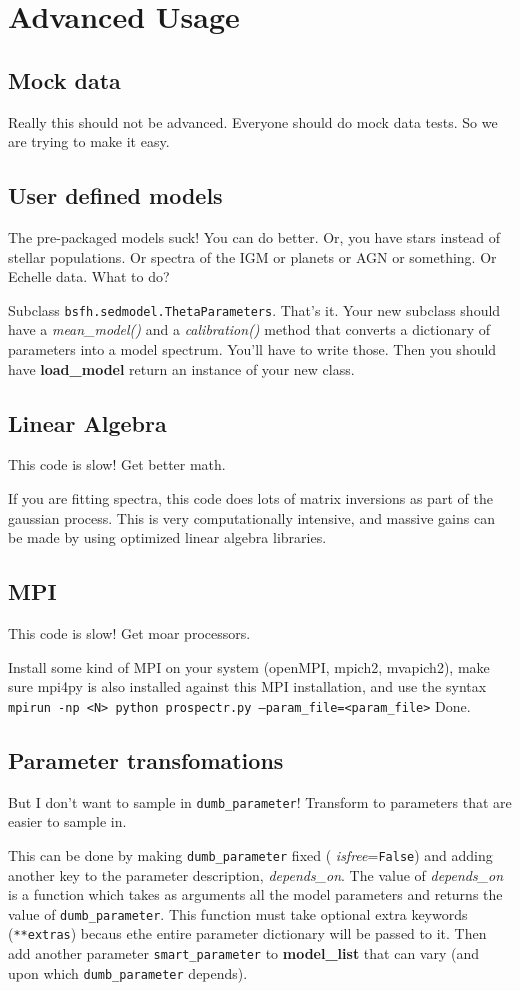 \documentclass[12pt, letterpaper, preprint]{aastex}
\begin{document}
\section{Advanced Usage}

\subsection{Mock data}
Really this should not be advanced.  Everyone should do mock data
tests.  So we are trying to make it easy.

\subsection{User defined models}
The pre-packaged models suck!  You can do better.  Or, you have stars
instead of stellar populations.  Or spectra of the IGM or planets or
AGN or something. Or Echelle data. What to do?

Subclass \texttt{bsfh.sedmodel.ThetaParameters}.  That's it.  Your new
subclass should have a {\it mean\_model()} and a {\it calibration()}
method that converts a dictionary of parameters into a model spectrum.
You'll have to write those.  Then you should have {\bf load\_model}
return an instance of your new class.

\subsection{Linear Algebra}
This code is slow!  Get better math.

If you are fitting spectra, this code does lots of matrix inversions
as part of the gaussian process.  This is very computationally
intensive, and massive gains can be made by using optimized linear
algebra libraries.

\subsection{MPI}
This code is slow!  Get moar processors.

Install some kind of MPI on your system (openMPI, mpich2, mvapich2),
make sure mpi4py is also installed against this MPI installation, and
use the syntax \texttt{mpirun -np <N> python prospectr.py
--param\_file=<param\_file>} Done.


\subsection{Parameter transfomations}
But I don't want to sample in \texttt{dumb\_parameter}!  Transform to
parameters that are easier to sample in. 

This can be done by making \texttt{dumb\_parameter} fixed ({\it
isfree}=\texttt{False}) and adding another key to the parameter
description, {\it depends\_on}.  The value of {\it depends\_on} is a
function which takes as arguments all the model parameters and returns
the value of \texttt{dumb\_parameter}. This function must take
optional extra keywords (\texttt{**extras}) becaus ethe entire
parameter dictionary will be passed to it. Then add another parameter
\texttt{smart\_parameter} to {\bf model\_list} that can vary (and upon
which \texttt{dumb\_parameter} depends).
\end{document}
